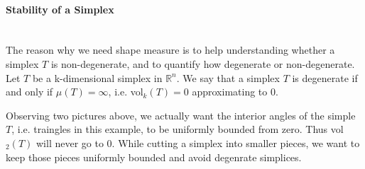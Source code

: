 \documentclass{article}
\begin{document}
    \paragraph{Stability of a Simplex}\mbox{}\\
    The reason why we need shape measure is to help understanding whether a simplex $T$ is non-degenerate, and to quantify how degenerate or non-degenerate. Let $T$ be a k-dimensional simplex in $\mathbb{R}^n$. We say that a simplex $T$ is degenerate if and only if $\mu({T}) = \infty$, i.e. vol$_k(T) = 0$ approximating to 0.

    

    Observing two pictures above, we actually want the interior angles of the simple $T$, i.e. traingles in this example, to be uniformly bounded from zero. Thus vol$_2(T)$ will never go to 0.
    While cutting a simplex into smaller pieces, we want to keep those pieces uniformly bounded and avoid degenrate simplices. \\
\end{document}
